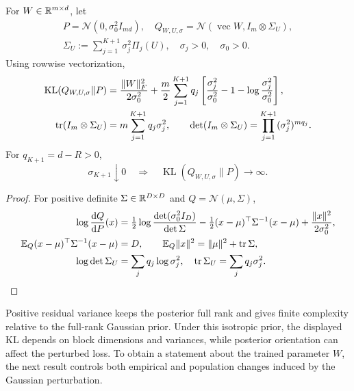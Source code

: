 \begin{proposition}\label{prop:rigid-pac-flag}
For $W\in\mathbb R^{m\times d}$, let
\begin{gather}
 P=\mathcal N(0,\sigma_0^2I_{md}),\quad
 Q_{W,U,\sigma}=\mathcal N(\operatorname{vec}W,I_m\otimes\Sigma_U),\\
 \Sigma_U:=\sum_{j=1}^{K+1}\sigma_j^2\Pi_j(U),\quad
 \sigma_j>0,\quad\sigma_0>0.
\end{gather}
Using rowwise vectorization,
\begin{align}
 \operatorname{KL}(Q_{W,U,\sigma}\|P)
 &=\frac{\|W\|_F^2}{2\sigma_0^2}
 +\frac m2\sum_{j=1}^{K+1}q_j
       \left[\frac{\sigma_j^2}{\sigma_0^2}-1
                         -\log\frac{\sigma_j^2}{\sigma_0^2}\right],\\
 \operatorname{tr}(I_m\otimes\Sigma_U)&=m\sum_{j=1}^{K+1}q_j\sigma_j^2,\qquad
 \det(I_m\otimes\Sigma_U)=\prod_{j=1}^{K+1}(\sigma_j^2)^{mq_j}.
\end{align}
For $q_{K+1}=d-R>0$,
\begin{equation}
 \sigma_{K+1}\downarrow0\quad\Longrightarrow\quad
 \operatorname{KL}(Q_{W,U,\sigma}\|P)\longrightarrow\infty.
\end{equation}
\end{proposition}
\begin{proof}
For positive definite $\Sigma\in\mathbb R^{D\times D}$ and $Q=\mathcal N(\mu,\Sigma)$,
\begin{align}
 \log\frac{\mathrm dQ}{\mathrm dP}(x)
 &=\tfrac12\log\frac{\det(\sigma_0^2I_D)}{\det\Sigma}
 -\tfrac12(x-\mu)^\top\Sigma^{-1}(x-\mu)
 +\frac{\|x\|^2}{2\sigma_0^2},\\
 \mathbb E_Q(x-\mu)^\top\Sigma^{-1}(x-\mu)&=D,\qquad
 \mathbb E_Q\|x\|^2=\|\mu\|^2+\operatorname{tr}\Sigma,\\
 \log\det\Sigma_U&=\sum_jq_j\log\sigma_j^2,\quad
 \operatorname{tr}\Sigma_U=\sum_jq_j\sigma_j^2.
\end{align}
\end{proof}
Positive residual variance keeps the posterior full rank and gives finite
complexity relative to the full-rank Gaussian prior. Under this isotropic
prior, the displayed KL depends on block dimensions and variances, while
posterior orientation can affect the perturbed loss. To obtain a statement
about the trained parameter $W$, the next result controls both empirical and
population changes induced by the Gaussian perturbation.

